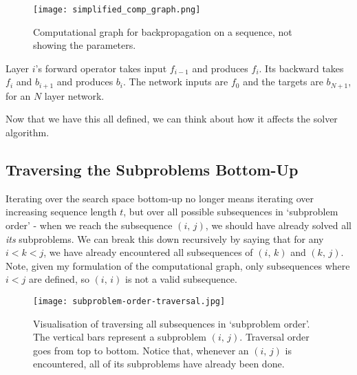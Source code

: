 \begin{figure}[h]
    \centering
    \texttt{[image: simplified\_comp\_graph.png]}
    \caption{Computational graph for backpropagation on a sequence, not showing the parameters.}
    \label{fig:3-comp-graph}
\end{figure}

Layer \(i\)'s forward operator takes input \(f_{i-1}\) and produces \(f_{i}\).
Its backward takes \(f_i\) and \(b_{i+1}\) and produces \(b_i\).
The network inputs are \(f_0\) and the targets are \(b_{N+1}\), for an \(N\) layer network.

Now that we have this all defined, we can think about how it affects the solver algorithm.

\subsection{Traversing the Subproblems Bottom-Up}
Iterating over the search space bottom-up no longer means iterating over increasing sequence length \(t\), but over all possible subsequences in `subproblem order' - when we reach the subsequence \((i,\, j)\), we should have already solved all \textit{its} subproblems.
We can break this down recursively by saying that for any \(i < k < j\), we have already encountered all subsequences of \((i,\, k)\) and \((k,\, j)\).
Note, given my formulation of the computational graph, only subsequences where \(i < j\) are defined, so \((i,\, i)\) is not a valid subsequence.

\begin{figure}[h]
    \centering
    \texttt{[image: subproblem-order-traversal.jpg]}
    \caption{Visualisation of traversing all subsequences in `subproblem order'. The vertical bars represent a subproblem \((i,\, j)\). Traversal order goes from top to bottom. Notice that, whenever an \((i,\, j)\) is encountered, all of its subproblems have already been done.}
    \label{fig:3-subproblem-order-traversal}
\end{figure}

